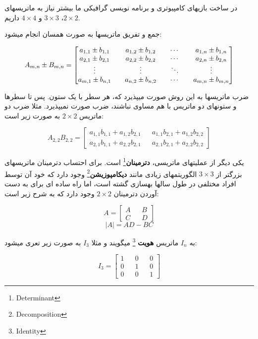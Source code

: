 \documentclass[14pt,a4paper]{memoir}
\begin{document}
	 
	 در ساخت بازیهای کامپیوتری و برنامه نویسی گرافیکی ما بیشتر نیاز به ماتریسهای $ 2\times2 $، $ 3\times3 $  و $ 4\times 4$ داریم.
	 
	 جمع و تفریق ماتریسها به صورت همسان انجام میشود:
	 
	 \[ A_{m, n}\pm B_{m, n} = \begin{bmatrix}
	 a_{1, 1} \pm b_{1, 1} && a_{1, 2} \pm b_{1, 2} && \cdots &&  a_{1, n} \pm b_{1, n} \\
	 a_{2, 1} \pm b_{2, 1} && a_{2, 2} \pm b_{2, 2} && \cdots &&  a_{2, n} \pm b_{2, n} \\
	 \vdots  && \vdots  && \ddots && \vdots \\
	 a_{m, 1} \pm b_{n, 1} && a_{n, {\tiny }2} \pm b_{n, 2} && \cdots &&  a_{m, n} \pm b_{m, n}
	 	
	 \end{bmatrix} \]
	 
	 ضرب ماتریسها به این روش صورت میپذیرد که، هر سطر با یک ستون. پس تا سطرها و ستونهای دو ماتریس با هم مساوی نباشند، ضرب صورت نمیپذیرد. مثلا ضرب دو ماتریس $ 2\times2 $ به صورت زیر است:
	 
	 \[ A_{2, 2}B_{2, 2} = \begin{bmatrix}
	 a_{1, 1} b_{1, 1} + a_{1, 2}  b_{2, 1} && a_{1, 1} b_{2, 1} + a_{1, 2}  b_{2, 2} \\
	 	a_{2, 1}  b_{1, 1} + a_{2, 2}  b_{2, 1} && a_{2, 1}  b_{2, 1} + a_{2, 2}  b_{2, 2}
	 \end{bmatrix} \]
	 
	
	 
	 
	

یکی دیگر از عملیتهای ماتریسی، \textbf{دترمینان}\footnote{Determinant} است. برای احتساب دترمینان ماتریسهای بزرگتر از  $ 3\times3 $ الگوریتمهای زیادی مانند \textbf{دیکامپوزیشن}\footnote{Decomposition} وجود دارد که خود آن توسط افراد مختلفی در طول سالها بهسازی گشته است، اما راه ساده ای برای به دست آوردن دترمینان $ 2\times2 $ وجود دارد که به شرح زیر است:

\[ A = \begin{bmatrix}
A && B\\ 
C && D
\end{bmatrix} \]
\[ |A| = AD - BC \]
	 
	 به $ I_{n} $ ماتریس \textbf{هویت} \footnote{Identity} میگویند و مثلا $ I_3 $ به صورت زیر تعری میشود:
	 
	 \[ I_{3} = \begin{bmatrix}
	 1 && 0 && 0 \\
	 0 && 1 && 0 \\
	 0 && 0 && 1
	 \end{bmatrix} \]
	 
\end{document}
